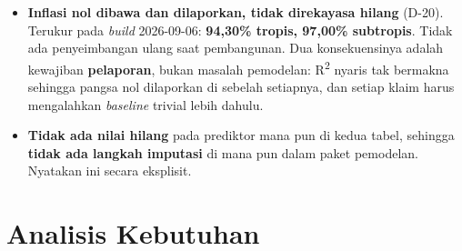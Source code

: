 \begin{itemize}
          menaikkan rerata target dan membuat R\textsuperscript{2} tampak lebih
          baik daripada sebenarnya.
          \textit{Catatan yang harus dipatuhi:} pembenaran kedua yang pernah
          diingat --- bahwa nol berarti "tidak ada galat sensor" --- \textbf{tidak
          boleh dipakai}, karena D-18 membantahnya dengan pengukuran proyek ini
          sendiri (cakupan hari minimum tropis 12,90\%).
    \item \textbf{Inflasi nol dibawa dan dilaporkan, tidak direkayasa hilang}
          (D-20). Terukur pada \textit{build} 2026-09-06: \textbf{94,30\%
          tropis, 97,00\% subtropis}. Tidak ada penyeimbangan ulang saat
          pembangunan. Dua konsekuensinya adalah kewajiban \textbf{pelaporan},
          bukan masalah pemodelan: R\textsuperscript{2} nyaris tak bermakna
          sehingga pangsa nol dilaporkan di sebelah setiapnya, dan setiap klaim
          harus mengalahkan \textit{baseline} trivial lebih dahulu.
    \item \textbf{Tidak ada nilai hilang} pada prediktor mana pun di kedua
          tabel, sehingga \textbf{tidak ada langkah imputasi} di mana pun dalam
          paket pemodelan. Nyatakan ini secara eksplisit.
\end{itemize}


\section{Analisis Kebutuhan}

